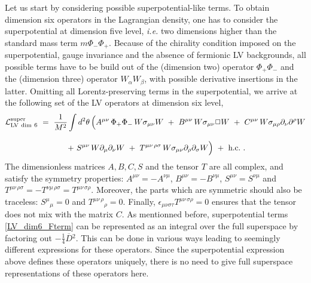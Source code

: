 \documentclass[12pt]{revtex4}
\begin{document}
Let us start by considering possible superpotential-like terms. 
To obtain dimension six operators in the Lagrangian density, 
one has to consider the superpotential at dimension five level, 
{\em i.e.} two dimensions higher than the standard mass term $m \Phi_-\Phi_+$. 
Because of the chirality condition imposed on the superpotential,
gauge invariance and the absence of 
fermionic LV backgrounds,  all possible terms have to be build out of the
(dimension two) operator $\Phi_+ \Phi_-$ and the (dimension three)
operator $W_\alpha W_\beta$, with possible derivative insertions in  
the latter. Omitting all Lorentz-preserving terms in the superpotential, we arrive at
the following set of the LV operators at dimension six level, 
\begin{gather} 
{\cal L}_{\rm{LV\ dim\ 6}}^{\rm{super}} ~=~ \frac{1}{M^2}
\int d^2 \theta \, \Big( 
A^{\mu\nu} \, \Phi_+ \Phi_-\, W \sigma_{\mu\nu} W ~+~ 
B^{\mu\nu} \, W \sigma_{\mu\nu} \Box W ~+~ 
C^{\mu\nu} \, W \sigma_{\mu\rho} \partial_\nu \partial^\rho W 
\nonumber \\[2ex]
~+~ 
S^{\mu\nu}\, W \partial_\mu \partial_\nu W ~+~ 
T^{\mu\nu\, \rho\sigma} \, 
W \sigma_{\mu\nu} \partial_\rho \partial_\sigma W 
\Big) ~+~ \text{h.c.}~. 
\label{LV_dim6_Fterm}
\end{gather}
The dimensionless matrices $A, B, C, S$ and the tensor $T$ are all complex,
and satisfy the symmetry properties: $A^{\mu\nu} = -A^{\nu\mu}$, 
$B^{\mu\nu} = -B^{\nu\mu}$, 
$S^{\mu\nu} =S^{\nu\mu}$ and 
$T^{\mu\nu\, \rho\sigma} = -T^{\nu\mu\, \rho\sigma} = 
T^{\mu\nu\, \sigma\rho}$. Moreover, the parts which are symmetric
should also be traceless: $S^\mu{}_\mu=0$ and 
$T^{\mu\nu\, \rho}{}_\rho = 0$. Finally,  
$\epsilon_{\mu\nu\sigma\tau}T^{\mu\nu\, \sigma\rho} = 0$ ensures that
the tensor does not mix with the matrix $C$. 
As mentionned before, superpotential terms \eqref{LV_dim6_Fterm} can be represented 
as an integral over the full superspace 
by factoring out $-\frac 14 \overline{D}{}^2$. This can be done in various ways
leading to seemingly different expressions for these operators. 
Since the superpotential expression above defines these 
operators uniquely, there is no need to give full superspace representations of
these operators here. 
\end{document}
